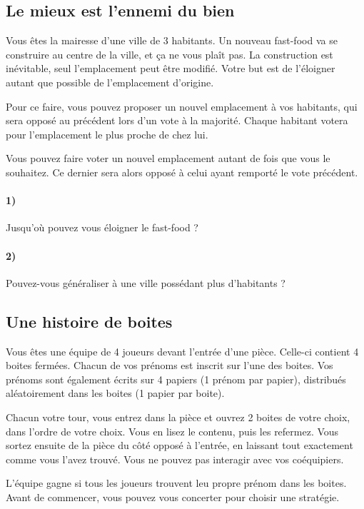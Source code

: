 \documentclass[a4paper,10pt,oneside]{article}
\begin{document}
\subsection{Le mieux est l'ennemi du bien}

Vous êtes la mairesse d'une ville de 3 habitants.
Un nouveau fast-food va se construire au centre de la ville, et ça ne vous plaît pas.
La construction est inévitable, seul l'emplacement peut être modifié.
Votre but est de l'éloigner autant que possible de l'emplacement d'origine.

Pour ce faire, vous pouvez proposer un nouvel emplacement à vos habitants, qui sera opposé au précédent lors d'un vote à la majorité.
Chaque habitant votera pour l'emplacement le plus proche de chez lui.

Vous pouvez faire voter un nouvel emplacement autant de fois que vous le souhaitez.
Ce dernier sera alors opposé à celui ayant remporté le vote précédent.


\paragraph*{1)} 
Jusqu'où pouvez vous éloigner le fast-food ?

\paragraph*{2)} 
Pouvez-vous généraliser à une ville possédant plus d'habitants ?


\subsection{Une histoire de boites}

Vous êtes une équipe de 4 joueurs devant l'entrée d'une pièce. 
Celle-ci contient 4 boites fermées.
Chacun de vos prénoms est inscrit sur l'une des boites.
Vos prénoms sont également écrits sur 4 papiers (1 prénom par papier), distribués aléatoirement dans les boites (1 papier par boite).

Chacun votre tour, vous entrez dans la pièce et ouvrez 2 boites de votre choix, dans l'ordre de votre choix. 
Vous en lisez le contenu, puis les refermez.
Vous sortez ensuite de la pièce du côté opposé à l'entrée, en laissant tout exactement comme vous l'avez trouvé.
Vous ne pouvez pas interagir avec vos coéquipiers.

L'équipe gagne si tous les joueurs trouvent leu propre prénom dans les boites. Avant de commencer, vous pouvez vous concerter pour choisir une stratégie.
\end{document}
